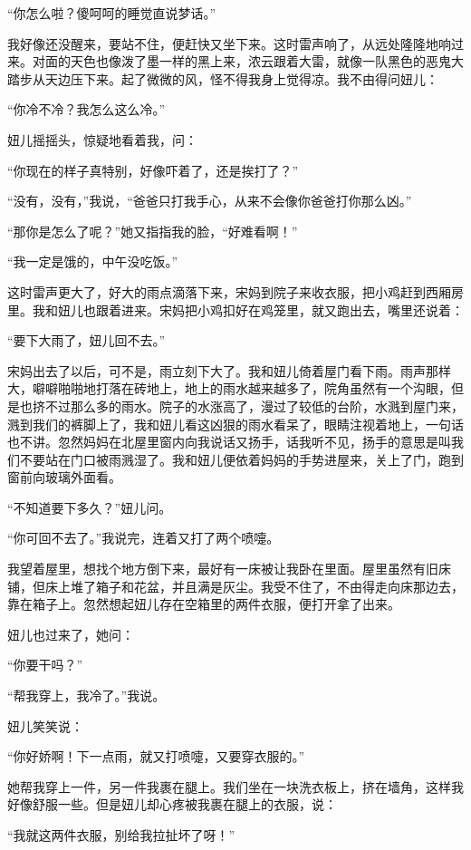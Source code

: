 \par “你怎么啦？傻呵呵的睡觉直说梦话。”
\par 我好像还没醒来，要站不住，便赶快又坐下来。这时雷声响了，从远处隆隆地响过来。对面的天色也像泼了墨一样的黑上来，浓云跟着大雷，就像一队黑色的恶鬼大踏步从天边压下来。起了微微的风，怪不得我身上觉得凉。我不由得问妞儿：
\par “你冷不冷？我怎么这么冷。”
\par 妞儿摇摇头，惊疑地看着我，问：
\par “你现在的样子真特别，好像吓着了，还是挨打了？”
\par “没有，没有，”我说，“爸爸只打我手心，从来不会像你爸爸打你那么凶。”
\par “那你是怎么了呢？”她又指指我的脸，“好难看啊！”
\par “我一定是饿的，中午没吃饭。”
\par 这时雷声更大了，好大的雨点滴落下来，宋妈到院子来收衣服，把小鸡赶到西厢房里。我和妞儿也跟着进来。宋妈把小鸡扣好在鸡笼里，就又跑出去，嘴里还说着：
\par “要下大雨了，妞儿回不去。”
\par 宋妈出去了以后，可不是，雨立刻下大了。我和妞儿倚着屋门看下雨。雨声那样大，噼噼啪啪地打落在砖地上，地上的雨水越来越多了，院角虽然有一个沟眼，但是也挤不过那么多的雨水。院子的水涨高了，漫过了较低的台阶，水溅到屋门来，溅到我们的裤脚上了，我和妞儿看这凶狠的雨水看呆了，眼睛注视着地上，一句话也不讲。忽然妈妈在北屋里窗内向我说话又扬手，话我听不见，扬手的意思是叫我们不要站在门口被雨溅湿了。我和妞儿便依着妈妈的手势进屋来，关上了门，跑到窗前向玻璃外面看。
\par “不知道要下多久？”妞儿问。
\par “你可回不去了。”我说完，连着又打了两个喷嚏。
\par 我望着屋里，想找个地方倒下来，最好有一床被让我卧在里面。屋里虽然有旧床铺，但床上堆了箱子和花盆，并且满是灰尘。我受不住了，不由得走向床那边去，靠在箱子上。忽然想起妞儿存在空箱里的两件衣服，便打开拿了出来。
\par 妞儿也过来了，她问：
\par “你要干吗？”
\par “帮我穿上，我冷了。”我说。
\par 妞儿笑笑说：
\par “你好娇啊！下一点雨，就又打喷嚏，又要穿衣服的。”
\par 她帮我穿上一件，另一件我裹在腿上。我们坐在一块洗衣板上，挤在墙角，这样我好像舒服一些。但是妞儿却心疼被我裹在腿上的衣服，说：
\par “我就这两件衣服，别给我拉扯坏了呀！”

